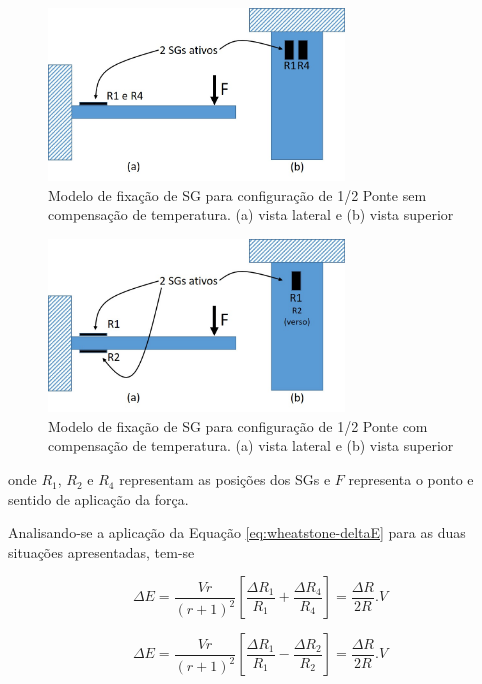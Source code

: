 \documentclass[a4paper]{instrumentacao}
\begin{document}
\begin{figure}[H]
\center
\includegraphics[width=0.7\textwidth]{1-2 ponte_1.jpg}
\caption{Modelo de fixação de SG para configuração de 1/2 Ponte sem compensação de temperatura. (a) vista lateral e (b) vista superior}
\label{fig:1-2 ponte_sem temp}
\end{figure}

\begin{figure}[H]
\center
\includegraphics[width=0.7\textwidth]{1-2 ponte_2.jpg}
\caption{Modelo de fixação de SG para configuração de 1/2 Ponte com compensação de temperatura. (a) vista lateral e (b) vista superior}
\label{fig:1-2 ponte_com temp}
\end{figure}

\noindent onde $R_1$, $R_2$ e $R_4$ representam as posições dos SGs e $F$ representa o ponto e sentido de aplicação da força.

Analisando-se a aplicação da Equação \ref{eq:wheatstone-deltaE} para as duas situações apresentadas, tem-se

\begin{equation}
	\Delta E=\frac{V r}{(r+1)^2}\left [ \frac{\Delta R_1}{R_1}+\frac{\Delta R_4}{R_4} \right ]=\frac{\Delta R}{2R}.V
	\label{eq:wheatstone-deltaE-1_2ponte_sem_comp}
\end{equation}

\begin{equation}
	\Delta E=\frac{V r}{(r+1)^2}\left [ \frac{\Delta R_1}{R_1}-\frac{\Delta R_2}{R_2} \right ]=\frac{\Delta R}{2R}.V
	\label{eq:wheatstone-deltaE-1_2ponte_com_comp}
\end{equation}
\end{document}
